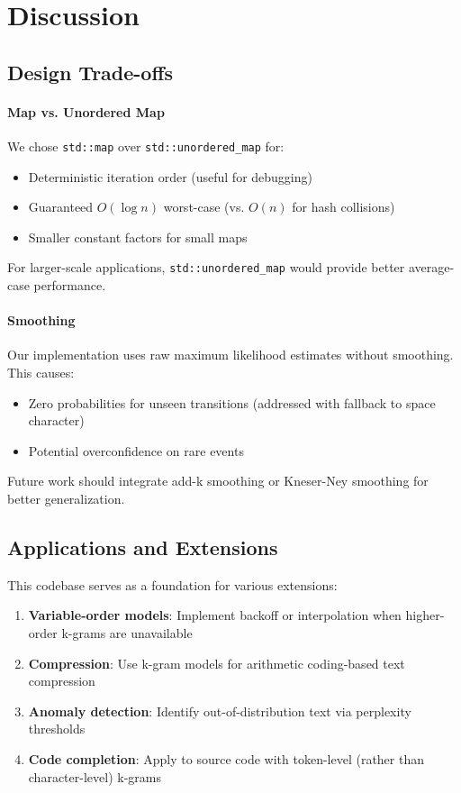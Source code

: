 \documentclass[11pt,letterpaper]{article}
\begin{document}
\section{Discussion}

\subsection{Design Trade-offs}

\paragraph{Map vs. Unordered Map}
We chose \texttt{std::map} over \texttt{std::unordered\_map} for:
\begin{itemize}
    \item Deterministic iteration order (useful for debugging)
    \item Guaranteed $O(\log n)$ worst-case (vs. $O(n)$ for hash collisions)
    \item Smaller constant factors for small maps
\end{itemize}

For larger-scale applications, \texttt{std::unordered\_map} would provide better average-case performance.

\paragraph{Smoothing}
Our implementation uses raw maximum likelihood estimates without smoothing. This causes:
\begin{itemize}
    \item Zero probabilities for unseen transitions (addressed with fallback to space character)
    \item Potential overconfidence on rare events
\end{itemize}

Future work should integrate add-k smoothing or Kneser-Ney smoothing for better generalization.

\subsection{Applications and Extensions}

This codebase serves as a foundation for various extensions:

\begin{enumerate}
    \item \textbf{Variable-order models}: Implement backoff or interpolation when higher-order k-grams are unavailable
    \item \textbf{Compression}: Use k-gram models for arithmetic coding-based text compression
    \item \textbf{Anomaly detection}: Identify out-of-distribution text via perplexity thresholds
    \item \textbf{Code completion}: Apply to source code with token-level (rather than character-level) k-grams
\end{enumerate}
\end{document}
